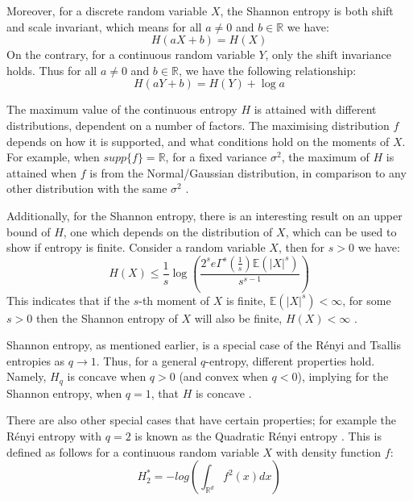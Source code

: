 \documentclass[12pt]{report}
\begin{document}
Moreover, for a discrete random variable $X$, the Shannon entropy is both shift and scale invariant, which means for all $a \neq 0$ and $b \in \mathbb{R}$ we have:
\begin{equation}
H(aX + b) = H(X)
\end{equation}
On the contrary, for a continuous random variable $Y$, only the shift invariance holds. Thus for all $a \neq 0$ and $b \in \mathbb{R}$, we have the following relationship:
\begin{equation}
H(aY + b) = H(Y) + \log a
\end{equation}

The maximum value of the continuous entropy $H$ is attained with different distributions, dependent on a number of factors. The maximising distribution $f$ depends on how it is supported, and what conditions hold on the moments of $X$. For example, when $supp\{f\} = \mathbb{R}$, for a fixed variance $\sigma^2$, the maximum of $H$ is attained when $f$ is from the Normal/Gaussian distribution, in comparison to any other distribution with the same $\sigma^2$ \cite{paper8}.

Additionally, for the Shannon entropy, there is an interesting result on an upper bound of $H$, one which depends on the distribution of $X$, which can be used to show if entropy is finite. Consider a random variable $X$, then for $s > 0$ we have:
\begin{equation}
H(X) \leq \frac{1}{s} \log \left( \frac{2^s e \Gamma^s (\frac{1}{s}) \mathbb{E}(|X|^s)}{s^{s-1}}  \right)
\end{equation}
This indicates that if the $s$-th moment of $X$ is finite, $ \mathbb{E}(|X|^s) < \infty$, for some $s > 0$ then the Shannon entropy of $X$ will also be finite, $H(X) < \infty$ \cite{book3}.

Shannon entropy, as mentioned earlier, is a special case of the R\'enyi and Tsallis entropies as $q \to 1$. Thus, for a general $q$-entropy, different properties hold. Namely, $H_{q}$ is concave when $q > 0$ (and convex when $q<0$), implying for the Shannon entropy, when $q=1$, that $H$ is concave \cite{paper2}.

There are also other special cases that have certain properties; for example the R\'enyi entropy with $q=2$ is known as the Quadratic R\'enyi entropy \cite{paper5}. This is defined as follows for a continuous random variable $X$ with density function $f$:
\begin{equation} 
H_{2}^{*} = - log\left( \int_{\mathbb{R}^{d}} f^2(x) dx \right) \label{QuadRenEnt} 
\end{equation} 
\end{document}

